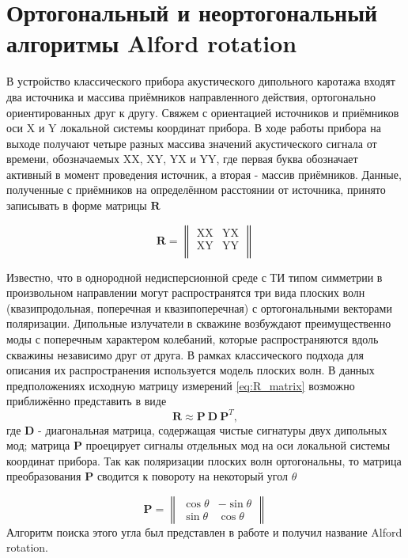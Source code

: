 \documentclass[a4paper,11pt]{article}
\begin{document}
\section{Ортогональный и неортогональный алгоритмы Alford rotation}
В устройство классического прибора акустического дипольного каротажа входят два источника и массива приёмников направленного действия, ортогонально ориентированных друг к другу. Свяжем с ориентацией источников и приёмников оси X и Y локальной системы координат прибора. В ходе работы прибора на выходе получают четыре разных массива значений акустического сигнала от времени, обозначаемых XX, XY, YX и YY, где первая буква обозначает активный в момент проведения источник, а вторая - массив приёмников. Данные, полученные с приёмников на определённом расстоянии от источника, принято записывать в форме матрицы $\mathbf{R}$ 

\begin{equation}
	\mathbf{R} = \left\|
	\begin{array}{cc}
	\text{XX} & \text{YX} \\
	\text{XY} & \text{YY} \\
	\end{array}
	\right\| 
	\label{eq:R_matrix}
\end{equation}

Известно, что в однородной недисперсионной среде с ТИ типом симметрии в произвольном направлении могут распространятся три вида плоских волн (квазипродольная, поперечная и квазипоперечная) с ортогональными векторами поляризации. Дипольные излучатели в скважине возбуждают преимущественно моды с поперечным характером колебаний, которые распространяются вдоль скважины независимо друг от друга. В рамках классического подхода для описания их распространения используется модель плоских волн.  В данных предположениях исходную матрицу измерений \eqref{eq:R_matrix} возможно приближённо представить в виде \cite{Dellinger1998}
\begin{equation}
	\mathbf{R} \approx \mathbf{P} \ \mathbf{D} \ \mathbf{P}^T, \label{eq:alford_symmetric} 
\end{equation}
где $\mathbf{D}$ - диагональная матрица, содержащая чистые сигнатуры двух дипольных мод; матрица $\mathbf{P}$ проецирует сигналы отдельных мод на оси локальной системы координат прибора. Так как поляризации плоских волн ортогональны, то матрица преобразования $\mathbf{P}$ сводится к повороту на некоторый угол $\theta$

\begin{equation*}
	\mathbf{P} = \left\|
	\begin{array}{cc}
	\cos \theta &-\sin \theta \\ 
	\sin \theta & \cos \theta
	\end{array} 
	\right\| 
\end{equation*}
Алгоритм поиска этого угла был представлен в работе \cite{Alford1986} и получил название Alford rotation.
\end{document}
